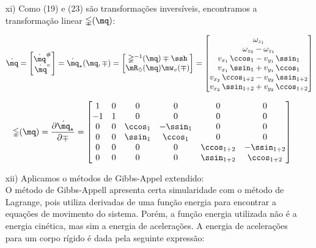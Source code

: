\begin{itemize}
\begin{itemize}
	\item[xi)] Como (19) e (23) s\~ao transforma\c{c}\~oes invers\'iveis, encontramos a transforma\c{c}\~ao linear $\mathbb{\Gamma}(\mq)$:
	
	\begin{equation}
	\dot{\mq} =
	\begin{bmatrix}
	\dot{\mq}^{\#} \\
	\dot{\mq}^\circ \\
	\end{bmatrix}
	= \dot{\mq}_\star(\mq,\mp) =
	\begin{bmatrix}
	\mathbb{\Psi}^{-1} (\mq) \mp\ssh \\
	\mR_\Diamond (\mq) \mw_v (\mp)
	\end{bmatrix}
	=
	\begin{bmatrix}
	\omega_{z_1} \\
	\omega_{z_2}-\omega_{z_1}\\
	v_{x_1} \, \ccos_1 - v_{y_1} \, \ssin_1 \\
	v_{x_1} \, \ssin_1 + v_{y_1} \, \ccos_1 \\
	v_{x_2} \, \ccos_{1+2} - v_{y_2} \, \ssin_{1+2} \\
	v_{x_2} \, \ssin_{1+2} + v_{y_2} \, \ccos_{1+2} \\
	\end{bmatrix}
	\end{equation}
	
	\begin{equation}
	\mathbb{\Gamma}(\mq) = \frac{\partial \dot{\mq}_\star}{\partial \mp} =
	\begin{bmatrix}
	1 & 0 & 0 & 0 & 0 & 0 \\
	-1 & 1 & 0 & 0 & 0 & 0 \\
	0 & 0 & \ccos_1 & -\ssin_1 & 0 & 0 \\
	0 & 0 & \ssin_1 & \ccos_1 & 0 & 0 \\
	0 & 0 & 0 & 0 & \ccos_{1+2} & -\ssin_{1+2} \\
	0 & 0 & 0 & 0 & \ssin_{1+2} & \ccos_{1+2} \\
	\end{bmatrix}
	\end{equation}

	\item[xii)] Aplicamos o métodos de Gibbs-Appel extendido: \\
	
	O método de Gibbs-Appell apresenta certa simularidade com o método de Lagrange, pois utiliza derivadas de uma fun\c{c}\~ao energia para encontrar a equa\c{c}\~oes de movimento do sistema. Por\'em, a fun\c{c}\~ao energia utilizada não é a energia cinética, mas sim a energia de acelera\c{c}\~oes. A energia de acelera\c{c}\~oes para um corpo r\'igido \'e dada pela seguinte express\~ao:


\end{itemize}
\end{itemize}
